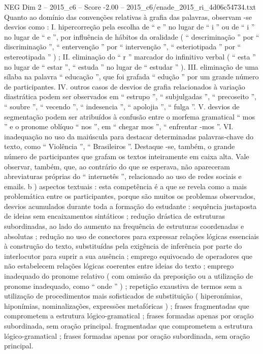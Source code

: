 \begin{textsample}{NEG Dim 2 – 2015\_c6 – Score -2.00 – 2015\_c6/enade\_2015\_ri\_4d06c54734.txt}
Quanto ao domínio das convenções relativas à grafia das palavras, observam -se desvios como : I. hipercorreção pela escolha de “ e ” no lugar de “ i ” ou de “ i ” no lugar de “ e ”, por influência de hábitos da oralidade ( “ descriminação ” por “ discriminação ”, “ entervenção ” por “ intervenção ”, “ esteriotipada ” por “ estereotipada ” ) ; II. eliminação do “ r ” marcador do infinitivo verbal ( “ esta ” no lugar de “ estar ”, “ estuda ” no lugar de “ estudar ” ).
III. eliminação de uma sílaba na palavra “ educação ”, que foi grafada “ edução ” por um grande número de participantes.
IV. outros casos de desvios de grafia relacionados à variação diastrática podem ser observados em “ estrupo ”, “ subjulgadas ”, “ precoseito ”, “ soubre ”, “ vecendo ”, “ indesencia ”, “ apolojia ”, “ fulga ”.
V. desvios de segmentação podem ser atribuídos à confusão entre o morfema gramatical “ mos ” e o pronome oblíquo “ nos ”, em “ chegar mos ”, “ enfrentar -mos ”.
VI. inadequação no uso da maiúscula para destacar determinadas palavras-chave do texto, como “ Violência ”, “ Brasileiros ”.
Destaque -se, também, o grande número de participantes que grafam os textos inteiramente em caixa alta.
Vale observar, também, que, ao contrário do que se esperava, não apareceram abreviaturas próprias do “ internetês ”, relacionado ao uso de redes sociais e emails. b ) aspectos textuais : esta competência é a que se revela como a mais problemática entre os participantes, porque são muitos os problemas observados, desvios acumulados durante toda a formação do estudante : sequência justaposta de ideias sem encaixamentos sintáticos ; redução drástica de estruturas subordinadas, ao lado do aumento na frequência de estruturas coordenadas e absolutas ; redução no uso de conectores para expressar relações lógicas essenciais à construção do texto, substituídas pela exigência de inferência por parte do interlocutor para suprir a sua ausência ; emprego equivocado de operadores que não estabelecem relações lógicas coerentes entre ideias do texto ; emprego inadequado do pronome relativo ( com omissão da preposição ou a utilização de pronome inadequado, como “ onde ” ) ; repetição exaustiva de termos sem a utilização de procedimentos mais sofisticados de substituição ( hiperonímias, hiponímias, nominalizações, expressões metafóricas ) ; frases fragmentadas que comprometem a estrutura lógico-gramatical ; frases formadas apenas por oração subordinada, sem oração principal. fragmentadas que comprometem a estrutura lógico-gramatical ; frases formadas apenas por oração subordinada, sem oração principal.

\end{textsample}
